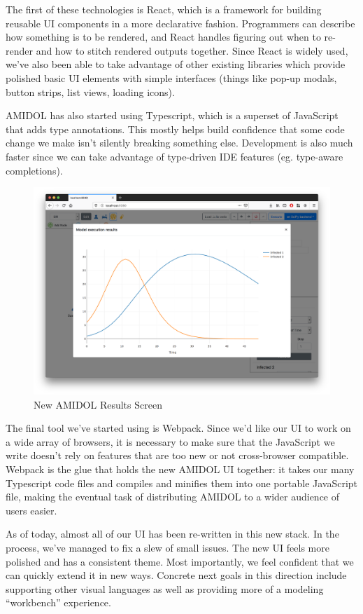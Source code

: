 \documentclass[12pt]{galois-whitepaper}
\begin{document}
The first of these technologies is React, which is a framework for
building reusable UI components in a more declarative
fashion. Programmers can
describe how something is to be rendered, and React handles figuring
out when to re-render and how to stitch rendered outputs
together. Since React is widely used, we’ve also been able to take
advantage of other existing libraries which provide polished basic UI
elements with simple interfaces (things like pop-up modals, button
strips, list views, loading icons).

AMIDOL has also started using Typescript, which is a superset of JavaScript
that adds type annotations. This mostly helps build confidence that
some code change we make isn’t silently breaking something
else. Development is also much faster since we can take advantage of
type-driven IDE features (eg. type-aware completions).

  \begin{figure}
    \centering
    \includegraphics[width=\textwidth]{figs/results.png}
    \caption{New AMIDOL Results Screen}
    \label{Fig:ResultsScreen}
  \end{figure}

The final tool we’ve started using is Webpack. Since we’d like our UI
to work on a wide array of browsers, it is necessary to make sure that
the JavaScript we write doesn’t rely on features that are too new or
not cross-browser compatible. Webpack is the glue that holds the new
AMIDOL UI together: it takes our many Typescript code files and compiles
and minifies them into one portable JavaScript file, making the
eventual task of distributing AMIDOL to a wider audience of users easier.

As of today, almost all of our UI has been re-written in this new
stack. In the process, we’ve managed to fix a slew of small
issues. The new UI feels more polished and has a consistent
theme. Most importantly, we feel confident that we can quickly extend
it in new ways. Concrete next goals in this direction include
supporting other visual languages as well as providing more of a
modeling “workbench” experience.
  
\end{document}
